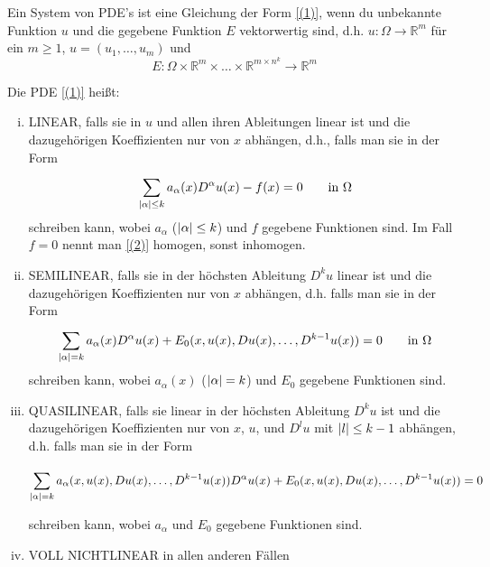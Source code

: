 \begin{definition}
	Ein System von PDE's ist eine Gleichung der Form \eqref{(1)}, wenn du unbekannte Funktion $u$ und die gegebene Funktion $E$ vektorwertig sind, d.h. $u: \Omega \to \mathbb{R}^m$ für ein $m \geq 1$, $u = (u_1, \dots, u_m)$ und
	\[
		E: \Omega \times \mathbb{R}^m \times \dots \times \mathbb{R}^{m \times n^k} \to \mathbb{R}^m
	\]
\end{definition}
\begin{definition}
		Die PDE \eqref{(1)} heißt:
		\begin{enumerate}[(i)]
			\item LINEAR, falls sie in $u$ und allen ihren Ableitungen linear ist und die dazugehörigen Koeffizienten nur von $x$ abhängen, d.h., falls man sie in der Form
			\begin{equation}
				\sum_{\lvert\alpha\rvert\leq k}^{}a_{\alpha}(x) D^{\alpha}u(x) - f(x) = 0 \qquad \text{in } \Omega \label{(2)}
			\end{equation} 
			schreiben kann, wobei $a_{\alpha}$ ($\lvert\alpha\rvert\leq k$) und $f$ gegebene Funktionen sind.
			Im Fall $f=0$ nennt man \eqref{(2)} homogen, sonst inhomogen.
			\item SEMILINEAR, falls sie in der höchsten Ableitung $D^ku$ linear ist und die dazugehörigen Koeffizienten nur von $x$ abhängen, d.h. falls man sie in der Form
			\begin{equation}
				\sum_{\lvert\alpha\rvert=k}^{}a_{\alpha}(x)D^{\alpha}u(x) + E_0(x,u(x),Du(x),\dots,D^{k-1}u(x))=0 \qquad \text{in }\Omega
			\end{equation}
			schreiben kann, wobei $a_{\alpha}(x)$ ($\lvert\alpha\rvert=k$) und $E_0$ gegebene Funktionen sind.
			\item QUASILINEAR, falls sie linear in der höchsten Ableitung $D^ku$ ist und die dazugehörigen Koeffizienten nur von $x$, $u$, und $D^lu$ mit $\lvert l\rvert\leq k-1$ abhängen, 
			d.h. falls man sie in der Form
			\begin{small}
			\begin{equation}
				\sum_{\lvert\alpha\rvert=k}^{}a_{\alpha}(x,u(x),Du(x),\dots,D^{k-1}u(x))D^{\alpha}u(x) + E_0(x,u(x),Du(x),\dots,D^{k-1}u(x)) = 0 
			\end{equation}
			\end{small}
			schreiben kann, wobei $a_{\alpha}$ und $E_0$ gegebene Funktionen sind.
			\item VOLL NICHTLINEAR in allen anderen Fällen
			
		\end{enumerate}
\end{definition}

